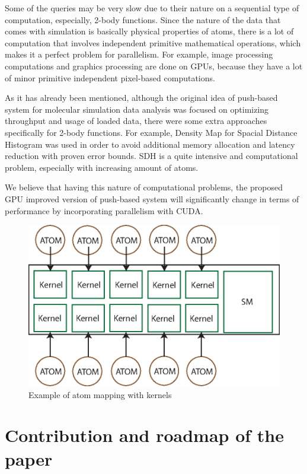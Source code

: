 \documentclass[11pt,a4paper]{report}
\begin{document}
Some of the queries may be very slow due to their nature on a sequential type of computation,  especially, 2-body functions. Since the nature of the data that comes with simulation is basically physical properties of atoms, there is a lot of computation that involves independent primitive mathematical operations, which makes it a perfect problem for parallelism. For example, image processing computations and graphics processing are done on GPUs, because they have a lot of minor primitive independent pixel-based computations.

As it has already been mentioned, although the original idea of push-based system for molecular simulation data analysis was focused on optimizing throughput and usage of loaded data, there were some extra approaches specifically for 2-body functions. For example, Density Map for Spacial Distance Histogram was used in order to avoid additional memory allocation and latency reduction with proven error bounds. SDH is a quite intensive and computational problem, especially with increasing amount of atoms. 

We believe that having this nature of computational problems, the proposed GPU improved version of push-based system will significantly change in terms of performance by incorporating parallelism with CUDA.

\begin{figure}
\centering
\centerline{\includegraphics[width=0.5\columnwidth]{images/kernelatom.eps}}
\caption{ Example of atom mapping with kernels}
 \label{fg:kernelatom}


\end{figure}

\section{Contribution and roadmap of the paper} 
\end{document}
